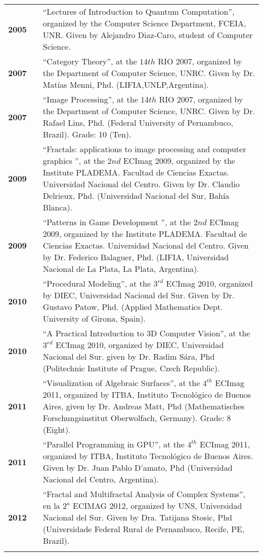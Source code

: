 \documentclass[a4paper,12pt]{article}
\begin{document}
\begin{tabular}{lcp{10 cm}}
\bf{2005} & &\textquotedblleft Lectures of Introduction to Quantum Computation\textquotedblright, organized by the Computer Science Department, FCEIA, UNR. Given by Alejandro Diaz-Caro, student of Computer Science.\\
\bf{2007}& & \textquotedblleft Category Theory\textquotedblright, at the $14{th}$ RIO 2007, organized by the Department of Computer Science, UNRC. Given by Dr. Mat\'ias Menni, Phd. (LIFIA,UNLP,Argentina).\\
\bf{2007}& & \textquotedblleft Image Processing\textquotedblright, at the $14{th}$ RIO 2007, organized by the Department of Computer Science, UNRC. Given by Dr. Rafael Lins, Phd. (Federal University of Pernambuco, Brazil). Grade: 10 (Ten).\\
\bf{2009}& & \textquotedblleft Fractals: applications to image processing and computer graphics
 \textquotedblright, at the $2{nd}$ ECImag 2009, organized by the Institute PLADEMA. Facultad de Ciencias Exactas. Universidad Nacional del Centro. Given by Dr. Claudio Delrieux, Phd. (Universidad Nacional del Sur, Bah\'ia Blanca).\\
\bf{2009}& & \textquotedblleft Patterns in Game Development \textquotedblright, at the $2{nd}$ ECImag 2009, organized by the Institute PLADEMA. Facultad de Ciencias Exactas. Universidad Nacional del Centro. Given by Dr. Federico Balaguer, Phd. (LIFIA, Universidad Nacional de La Plata, La Plata, Argentina).\\
\bf{2010}& & \textquotedblleft Procedural Modeling\textquotedblright, at the $3^{rd}$ ECImag 2010, organized by DIEC, Universidad Nacional del Sur. Given by Dr. Gustavo Patow, Phd. (Applied Mathematics Dept. University of Girona, Spain).\\
\bf{2010}& & \textquotedblleft A Practical Introduction to 3D Computer Vision\textquotedblright, at the $3^{rd}$ ECImag 2010, organized by DIEC, Universidad Nacional del Sur. given by Dr. Radim S\'ara, Phd (Politechnic Institute of Prague, Czech Republic).\\
\bf{2011}& & \textquotedblleft Visualization of Algebraic Surfaces\textquotedblright, at the $4^{th}$ ECImag 2011, organized by ITBA, Instituto Tecnol\'ogico de Buenos Aires, given by Dr. Andreas Matt, Phd (Mathematisches Forschungsinstitut Oberwolfach, Germany). Grade: 8 (Eight).\\
\bf{2011}& & \textquotedblleft Parallel Programming in GPU\textquotedblright, at the $4^{th}$ ECImag 2011, organized by ITBA, Instituto Tecnol\'ogico de Buenos Aires. Given by Dr. Juan Pablo D'amato, Phd (Universidad Nacional del Centro, Argentina).\\
\bf{2012}& & \textquotedblleft Fractal and Multifractal Analysis of Complex Systems\textquotedblright, en la $2^{a}$ ECIMAG 2012, organized by UNS, Universidad Nacional del Sur. Given by Dra. Tatijana Stosic, Phd (Universidade Federal Rural de Pernambuco, Recife, PE, Brazil).\\
\\
\end{tabular}
\end{document}
